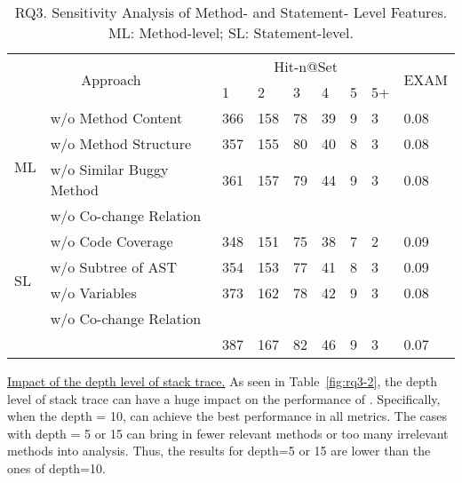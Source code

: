 \begin{table}[t]
	\caption{RQ3. Sensitivity Analysis of Method- and Statement- Level Features. ML: Method-level; SL: Statement-level.}
	{\small
		\begin{center}
			\renewcommand{\arraystretch}{1}
			\begin{tabular}{p{0.3cm}<{\centering}|p{3cm}|p{0.3cm}<{\centering}|p{0.3cm}<{\centering}|p{0.2cm}<{\centering}|p{0.2cm}<{\centering}|p{0.15cm}<{\centering}|p{0.15cm}<{\centering}|p{0.7cm}<{\centering}}
				\hline
				\multicolumn{2}{c|}{\multirow{2}{*}{Approach}}    & \multicolumn{6}{c|}{Hit-n@Set}& \multirow{2}{*}{EXAM}\\
				\cline{3-8}
				                 \multicolumn{2}{c|}{}   &1&2&3&4&5&5+&\\
				
				\hline 
				\multirow{4}{*}{ML}&w/o Method Content              & 366 & 158 & 78  & 39 & 9 & 3   & 0.08\\\cline{2-9}
				&w/o	Method Structure	                        & 357 & 155 & 80  & 40 & 8 & 3   & 0.08\\ \cline{2-9}
				&w/o Similar Buggy Method    	& 361 & 157 & 79  & 44 & 9 & 3   & 0.08\\ \cline{2-9}
				&w/o Co-change Relation          &  &  &   &  &  &    & \\ \cline{2-9}
				\hline
				\multirow{4}{*}{SL}&w/o Code Coverage               & 348 & 151 & 75  & 38 & 7 & 2   & 0.09\\\cline{2-9}
				&w/o	Subtree of AST  	        & 354 & 153 & 77  & 41 & 8 & 3   & 0.09\\ \cline{2-9}
				&w/o Variables               	& 373 & 162 & 78  & 42 & 9 & 3   & 0.08\\ \cline{2-9}
				&w/o Co-change Relation          &  &  &   &  &  &    & \\ \cline{2-9}
				\hline
			&	\tool                           & 387 & 167 & 82  & 46 & 9 & 3   & 0.07\\ \cline{2-9}
				\hline
			\end{tabular}
			
			\label{fig:rq3-1}
		\end{center}
	}
\end{table}

\underline{Impact of the depth level of stack trace.} 
As seen in Table~\ref{fig:rq3-2}, the depth level of stack trace can have a huge impact on the performance of {\tool}. Specifically, when the depth = 10, {\tool} can achieve the best performance in all metrics. The cases with depth = 5 or 15 can bring in fewer relevant methods or too many irrelevant methods into analysis. Thus, the results for depth=5 or 15 are lower than the ones of depth=10. 

